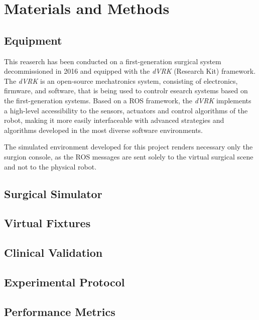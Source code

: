 \documentclass[../main.tex]{subfiles}
\begin{document}
\section{Materials and Methods}

\subsection{Equipment}
This reaserch has been conducted on a first-generation \davinci surgical system decommissioned in 2016 and equipped with the \textit{dVRK} (\davinci Research Kit) framework. The \textit{dVRK} \cite{Kazanzides2014} is an open-source mechatronics  system,  consisting  of  electronics,  firmware, and  software, that  is  being  used  to  controlr esearch systems based on the first-generation \davinci systems. Based on a ROS \cite{Quigley2009} framework, the \textit{dVRK} implements a high-level accessibility to the sensors, actuators and control algorithms of the \davinci robot, making it more easily interfaceable with advanced strategies and algorithms developed in the most diverse software environments.

The simulated environment developed for this project renders necessary only the surgion console, as the ROS messages are sent solely to the virtual surgical scene and not to the physical robot. 

\subsection{Surgical Simulator} 
\subsection{Virtual Fixtures}
\subsection{Clinical Validation}
\subsection{Experimental Protocol}
\subsection{Performance Metrics}



\end{document}
